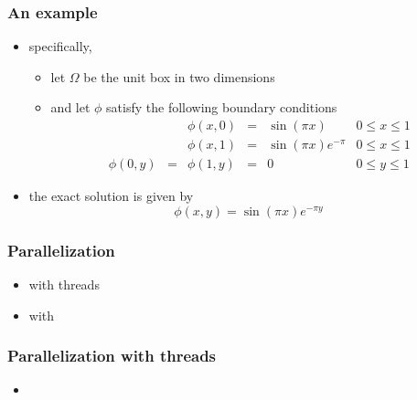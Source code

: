 \begin{frame}[fragile]
%
  \frametitle{An example}
%
  \begin{itemize}
%
% 
  \item specifically,
    \begin{itemize}
    \item let $\Omega$ be the unit box in two dimensions
    \item and let $\phi$ satisfy the following boundary conditions
      \begin{equation}
        \begin{array}{rcrcll}
          & & \phi(x,0) & = & \sin(\pi x)           & 0 \leq x \leq 1 \\
          & & \phi(x,1) & = & \sin(\pi x) e^{-\pi}  & 0 \leq x \leq 1 \\
          \phi(0,y) & = & \phi(1, y) & = & 0        & 0 \leq y \leq 1
        \end{array}
      \end{equation}
    \end{itemize}
%
  \item the exact solution is given by
    \begin{equation}
      \phi(x,y) = \sin(\pi x) e^{-\pi y}
    \end{equation}
% 
  \end{itemize}
%
\end{frame}

\begin{frame}[fragile]
%
  \frametitle{Parallelization}
%
  \begin{itemize}
%
  \item with threads
  \item with \mpi
%
  \end{itemize}
% 
\end{frame}

\begin{frame}[fragile]
%
  \frametitle{Parallelization with threads}
%
  \begin{itemize}
%
  \item
% 
  \end{itemize}
%
\end{frame}


